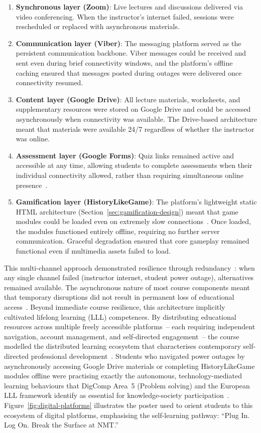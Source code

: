 \begin{enumerate}
\item \textbf{Synchronous layer (Zoom)}: Live lectures and discussions delivered via video conferencing. When the instructor's internet failed, sessions were rescheduled or replaced with asynchronous materials.
\item \textbf{Communication layer (Viber)}: The messaging platform served as the persistent communication backbone. Viber messages could be received and sent even during brief connectivity windows, and the platform's offline caching ensured that messages posted during outages were delivered once connectivity resumed.
\item \textbf{Content layer (Google Drive)}: All lecture materials, worksheets, and supplementary resources were stored on Google Drive and could be accessed asynchronously when connectivity was available. The Drive-based architecture meant that materials were available 24/7 regardless of whether the instructor was online.
\item \textbf{Assessment layer (Google Forms)}: Quiz links remained active and accessible at any time, allowing students to complete assessments when their individual connectivity allowed, rather than requiring simultaneous online presence~\cite{Hattie2009}.
\item \textbf{Gamification layer (HistoryLikeGame)}: The platform's lightweight static HTML architecture (Section~\ref{sec:gamification-design}) meant that game modules could be loaded even on extremely slow connections~\cite{KorniienkoSemerikov2024, Titova2025cte}. Once loaded, the modules functioned entirely offline, requiring no further server communication. Graceful degradation ensured that core gameplay remained functional even if multimedia assets failed to load.
\end{enumerate}

This multi-channel approach demonstrated resilience through redundancy~\cite{Tamim2011}: when any single channel failed (instructor internet, student power outage), alternatives remained available. The asynchronous nature of most course components meant that temporary disruptions did not result in permanent loss of educational access~\cite{Hlianenko2024, Zamkova2023299}. Beyond immediate course resilience, this architecture implicitly cultivated lifelong learning (LLL) competences. By distributing educational resources across multiple freely accessible platforms~-- each requiring independent navigation, account management, and self-directed engagement~-- the course modelled the distributed learning ecosystem that characterises contemporary self-directed professional development~\cite{UNESCO2023}. Students who navigated power outages by asynchronously accessing Google Drive materials or completing HistoryLikeGame modules offline were practising exactly the autonomous, technology-mediated learning behaviours that DigComp Area~5 (Problem solving) and the European LLL framework identify as essential for knowledge-society participation~\cite{Vuorikari2016}. Figure~\ref{fig:digital-platforms} illustrates the poster used to orient students to this ecosystem of digital platforms, emphasising the self-learning pathway: ``Plug In. Log On. Break the Surface at NMT.''


